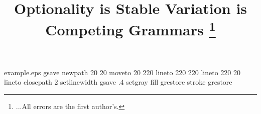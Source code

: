 %
%
%
%
%
\begin{filecontents*}{example.eps}
gsave
newpath
  20 20 moveto
  20 220 lineto
  220 220 lineto
  220 20 lineto
closepath
2 setlinewidth
gsave
  .4 setgray fill
grestore
stroke
grestore
\end{filecontents*}
%
\RequirePackage{fix-cm}
%
\documentclass{svjour3}                     %
%
\smartqed  %
%
\usepackage{mhsetup}
\usepackage{amsmath}
\usepackage{mathtools}
\usepackage{natbib}
\usepackage{graphicx}
\usepackage{float}
\usepackage{xyling}
\usepackage[utf8]{inputenc}
\usepackage{gb4e}
\noautomath
\usepackage[T1]{fontenc}
\usepackage{ tipa }
\usepackage{import}
\usepackage{color}
\usepackage{calc}
\usepackage{subfig}
\newcommand{\notejoel}[1]{\noindent \textbf{[[JCW:  #1 ]]}}
\newcommand{\notejoe}[1]{\noindent \textbf{[[JTF:  #1 ]]}}
\renewcommand{\theequation}{\Alph{equation}}




\title{Optionality is Stable Variation is Competing Grammars
\thanks{...All errors are the first author's.}}



